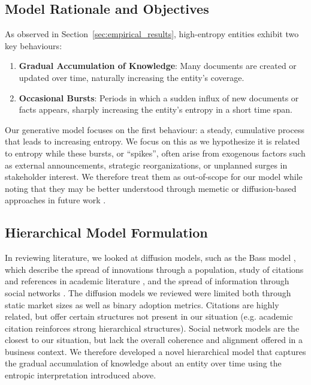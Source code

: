 \documentclass[11pt,a4paper]{article}
\begin{document}
\subsection{Model Rationale and Objectives}

As observed in Section~\ref{sec:empirical_results}, high-entropy entities exhibit two key behaviours:
\begin{enumerate}
    \item \textbf{Gradual Accumulation of Knowledge}: Many documents are created or updated over time, naturally increasing the entity's coverage.
    \item \textbf{Occasional Bursts}: Periods in which a sudden influx of new documents or facts appears, sharply increasing the entity's entropy in a short time span.
\end{enumerate}

Our generative model focuses on the first behaviour: a steady, cumulative process that leads to increasing entropy. We focus on this as we hypothesize it is related to entropy while these bursts, or ``spikes'', often arise from exogenous factors such as external announcements, strategic reorganizations, or unplanned surges in stakeholder interest. We therefore treat them as out-of-scope for our model while noting that they may be better understood through memetic or diffusion-based approaches in future work \cite{dawkins1976selfish,shifman2013memes}.

\subsection{Hierarchical Model Formulation}
\label{subsec:model_formulation}

In reviewing literature, we looked at diffusion models, such as the Bass model \cite{bass1969new}, which describe the spread of innovations through a population, study of citations and references in academic literature \cite{simkin2007mathematical}, and the spread of information through social networks \cite{shifman2013memes}. The diffusion models we reviewed were limited both through static market sizes as well as binary adoption metrics. Citations are highly related, but offer certain structures not present in our situation (e.g. academic citation reinforces strong hierarchical structures). Social network models are the closest to our situation, but lack the overall coherence and alignment offered in a business context. We therefore developed a novel hierarchical model that captures the gradual accumulation of knowledge about an entity over time using the entropic interpretation introduced above.
\end{document}
